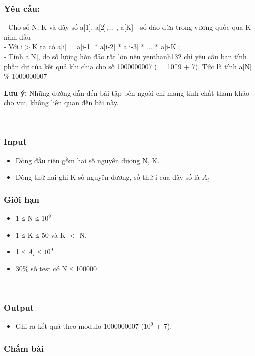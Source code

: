 \subsubsection{\textbf{Yêu cầu: }}

- Cho số N, K và dãy số a[1], a[2],... , a[K] - số đảo dừa trong vương quốc qua K năm đầu
\\- Với i$>$K ta có a[i] = a[i-1] * a[i-2] * a[i-3] * ... * a[i-K];
\\- Tính a[N], do số lượng hòn đảo rất lớn nên yenthanh132 chỉ yêu cầu bạn tính phần dư của kết quả khi chia cho số 1000000007 ( = 10^9 + 7). Tức là tính a[N] \% 1000000007

\textbf{Lưu ý: } Những đường dẫn đến bài tập bên ngoài chỉ mang tính chất tham khảo cho vui, không liên quan đến bài này.

 

\subsubsection{Input}
\begin{itemize}
	\item Dòng đầu tiên gồm hai số nguyên dương N, K.
	\item Dòng thứ hai ghi K số nguyên dương, số thứ i của dãy số là $A_{i}$
\end{itemize}

\subsubsection{Giới hạn}
\begin{itemize}
	\item 1 ≤ N ≤ $10^{9}$
	\item 1 ≤ K ≤ 50 và K $<$ N.
	\item 1 ≤ $A_{i}$ ≤ $10^{9}$
	\item 30\% số test có N ≤ 100000
\end{itemize}

 

\subsubsection{Output}
\begin{itemize}
	\item Ghi ra kết quả theo modulo 1000000007 ($10^{9}$ + 7).
\end{itemize}

\subsubsection{Chấm bài}

